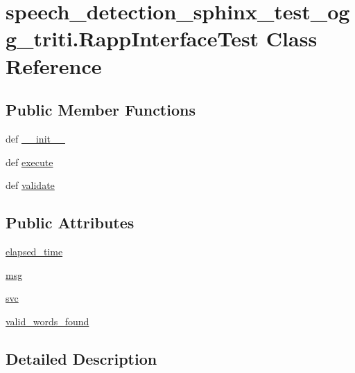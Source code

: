 \hypertarget{classspeech__detection__sphinx__test__ogg__triti_1_1RappInterfaceTest}{\section{speech\-\_\-detection\-\_\-sphinx\-\_\-test\-\_\-ogg\-\_\-triti.\-Rapp\-Interface\-Test Class Reference}
\label{classspeech__detection__sphinx__test__ogg__triti_1_1RappInterfaceTest}
}
\subsection*{Public Member Functions}
\begin{DoxyCompactItemize}
\item 
def \hyperlink{classspeech__detection__sphinx__test__ogg__triti_1_1RappInterfaceTest_ad03b8529f2cb7b329177c4109f58612e}{\-\_\-\-\_\-init\-\_\-\-\_\-}
\item 
def \hyperlink{classspeech__detection__sphinx__test__ogg__triti_1_1RappInterfaceTest_a52971cda2e8bea95411394a4bb65c063}{execute}
\item 
def \hyperlink{classspeech__detection__sphinx__test__ogg__triti_1_1RappInterfaceTest_a0994e3c5e8895f3d123a9115945d89ee}{validate}
\end{DoxyCompactItemize}
\subsection*{Public Attributes}
\begin{DoxyCompactItemize}
\item 
\hyperlink{classspeech__detection__sphinx__test__ogg__triti_1_1RappInterfaceTest_ac9f45476720710babd099d31b4163fb3}{elapsed\-\_\-time}
\item 
\hyperlink{classspeech__detection__sphinx__test__ogg__triti_1_1RappInterfaceTest_a6d5cf4a4367057b4d7dff4664e71ded2}{msg}
\item 
\hyperlink{classspeech__detection__sphinx__test__ogg__triti_1_1RappInterfaceTest_a1e28b1192e41f42e1e3103ffb6f7eda0}{svc}
\item 
\hyperlink{classspeech__detection__sphinx__test__ogg__triti_1_1RappInterfaceTest_ae3fe6a3bbd709b9c314aad0ab8368d2f}{valid\-\_\-words\-\_\-found}
\end{DoxyCompactItemize}


\subsection{Detailed Description}



